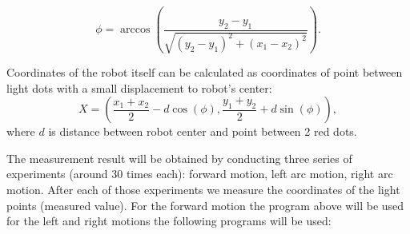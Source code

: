 \documentclass[a4paper, 12pt]{article}
\begin{document}
\begin{equation}
\phi = \arccos(\frac{y_2-y_1}{\sqrt{(y_2-y_1)^2+(x_1-x_2)^2}}).
\end{equation}

Coordinates of the robot itself can be calculated as coordinates of point between light dots with a small displacement to robot's center:
\begin{equation}
X = (\frac{x_1+x_2}{2}-d\cos(\phi),\frac{y_1+y_2}{2}+d \sin(\phi)),
\end{equation}
where $d$ is distance between robot center and point between 2 red dots.

 The measurement result will be obtained by conducting three series of experiments (around 30 times each): forward motion, left arc motion, right arc motion. After each of those experiments we measure the coordinates of the light points (measured value).  For the forward motion the program above will be used for the left and right motions the following programs will be used:
\end{document}

